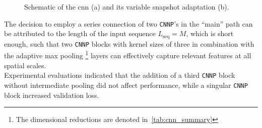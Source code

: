 \begin{figure}[H]
    \centering
    \hspace{0.5cm}
    \caption{Schematic of the \gls{cnn} (a) and its variable snapshot adaptation (b).}
    \label{fig:cnn_architecture}
\end{figure}

The decision to employ a series connection of two \texttt{CNNP}'s in the ``main'' path can be attributed to the length
of the input sequence \( L_{\text{seq}} = M\), which is short enough, such that two \texttt{CNNP} blocks with kernel
sizes of three in combination with the adaptive max pooling%
\footnote{The dimensional reductions are denoted in~\autoref{tab:cnn_summary}}
layers can effectively capture relevant features at all spatial scales. \\
Experimental evaluations indicated that the addition of a third \texttt{CNNP} block without intermediate pooling did not
affect performance, while a singular \texttt{CNNP} block increased validation loss.

